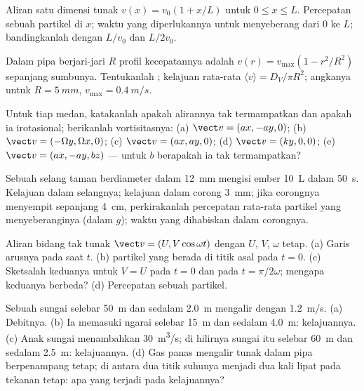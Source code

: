 \begin{exercise}[$\star$]\label{exo:b2:fluid-kinematics:2}
Aliran satu dimensi tunak $v(x) = v_0(1 + x/L)$ untuk $0 \le x \le L$.
Percepatan sebuah partikel di $x$; waktu yang diperlukannya untuk
menyeberang dari $0$ ke $L$; bandingkanlah dengan $L/v_0$ dan $L/2v_0$.
\end{exercise}

\begin{exercise}[$\star$]\label{exo:b2:fluid-kinematics:3}
Dalam pipa berjari-jari $R$ profil kecepatannya adalah $v(r) = v_{\max}(1 -
r^2/R^2)$ sepanjang sumbunya. Tentukanlah ; kelajuan rata-rata $\langle v\rangle
= D_V/\pi R^2$; angkanya untuk $R = \qty{5}{mm}$, $v_{\max} = \qty{0.4}{m/s}$.
\end{exercise}

\begin{exercise}[$\star$]\label{exo:b2:fluid-kinematics:4}
Untuk tiap medan, katakanlah apakah alirannya tak termampatkan dan
apakah ia irotasional; berikanlah vortisitasnya: (a) $\vect v = (ax, -ay, 0)$; (b)
$\vect v = (-\Omega y, \Omega x, 0)$; (c) $\vect v = (ax, ay, 0)$; (d) $\vect v =
(ky, 0, 0)$; (e) $\vect v = (ax, -ay, bz)$ --- untuk $b$ berapakah ia tak
termampatkan?
\end{exercise}

\begin{exercise}[$\star\star$]\label{exo:b2:fluid-kinematics:5}
Sebuah selang taman berdiameter dalam \qty{12}{mm} mengisi ember
\qty{10}{L} dalam \qty{50}{s}. Kelajuan dalam selangnya; kelajuan dalam
corong \qty{3}{mm}; jika corongnya menyempit sepanjang \qty{4}{cm},
perkirakanlah percepatan rata-rata partikel yang menyeberanginya (dalam
$g$); waktu yang dihabiskan dalam corongnya.
\end{exercise}

\begin{exercise}[$\star\star$]\label{exo:b2:fluid-kinematics:6}
Aliran bidang tak tunak $\vect v = (U, V\cos\omega t)$ dengan $U$, $V$, $\omega$
tetap. (a) Garis arusnya pada saat $t$. (b)  partikel yang berada di
titik asal pada $t = 0$. (c) Sketsalah keduanya untuk $V = U$ pada $t = 0$ dan pada
$t = \pi/2\omega$; mengapa keduanya berbeda? (d) Percepatan sebuah partikel.
\end{exercise}

\begin{exercise}[$\star\star$]\label{exo:b2:fluid-kinematics:7}
Sebuah sungai selebar \qty{50}{m} dan sedalam \qty{2.0}{m} mengalir dengan \qty{1.2}{m/s}. (a)
Debitnya. (b) Ia memasuki ngarai selebar \qty{15}{m} dan sedalam \qty{4.0}{m}:
kelajuannya. (c) Anak sungai menambahkan \qty{30}{m^3/s}; di hilirnya sungai itu
selebar \qty{60}{m} dan sedalam \qty{2.5}{m}: kelajuannya. (d) Gas panas mengalir tunak
dalam pipa berpenampang tetap; di antara dua titik suhunya
menjadi dua kali lipat pada tekanan tetap: apa yang terjadi pada kelajuannya?
\end{exercise}

